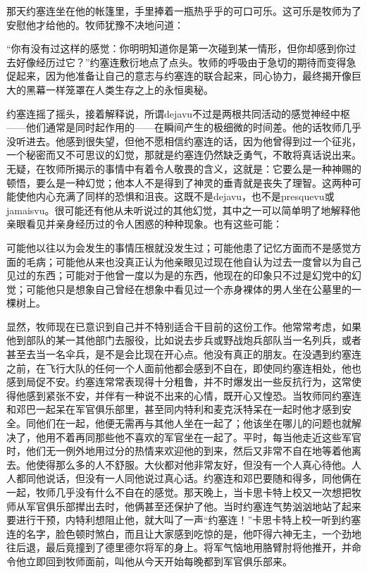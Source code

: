  


    那天约塞连坐在他的帐篷里，手里捧着一瓶热乎乎的可口可乐。这可乐是牧师为了安慰他才给他的。牧师犹豫不决地问道：

    “你有没有过这样的感觉：你明明知道你是第一次碰到某一情形，但你却感到你过去好像经历过它？”约塞连敷衍地点了点头。牧师的呼吸由于急切的期待而变得急促起来，因为他准备让自己的意志与约塞连的联合起来，同心协力，最终揭开像巨大的黑幕一样笼罩在人类生存之上的永恒奥秘。

    约塞连摇了摇头，接着解释说，所谓dejavu不过是两根共同活动的感觉神经中枢——他们通常是同时起作用的——在瞬间产生的极细微的时间差。他的话牧师几乎没听进去。他感到很失望，但他不愿相信约塞连的话，因为他曾得到过一个征兆，一个秘密而又不可思议的幻觉，那就是约塞连仍然缺乏勇气，不敢将真话说出来。无疑，在牧师所揭示的事情中有着令人敬畏的含义，这就是：它要么是一种神赐的顿悟，要么是一种幻觉；他本人不是得到了神灵的垂青就是丧失了理智。这两种可能使他内心充满了同样的恐惧和沮丧。这既不是dejavu，也不是presquevu或jamaisvu。很可能还有他从未听说过的其他幻觉，其中之一可以简单明了地解释他亲眼看见并亲身经历过的令人困惑的种种现象。也有这些可能：

    可能他以往以为会发生的事情压根就没发生过；可能他患了记忆方面而不是感觉方面的毛病；可能他从来也没真正认为他亲眼见过现在他自认为过去一度曾以为自己见过的东西；可能对于他曾一度以为是的东西，他现在的印象只不过是幻党中的幻觉；可能他只是想象自己曾经在想象中看见过一个赤身裸体的男人坐在公墓里的一棵树上。

 


    显然，牧师现在已意识到自己并不特别适合干目前的这份工作。他常常考虑，如果他到部队的某一其他部门去服役，比如说去步兵或野战炮兵部队当一名列兵，或者甚至去当一名伞兵，是不是会比现在开心点。他没有真正的朋友。在没遇到约塞连之前，在飞行大队的任何一个人面前他都会感到不自在，即使同约塞连相处，他也感到局促不安。约塞连常常表现得十分粗鲁，并不时爆发出一些反抗行为，这常使得他感到紧张不安，并伴有一种说不出来的心情，既开心又惶恐。当牧师同约塞连和邓巴一起呆在军官俱乐部里，甚至同内特利和麦克沃特呆在一起时他才感到安全。同他们在一起，他便无需再与其他人坐在一起了；他该坐在哪儿的问题也就解决了，他用不着再同那些他不喜欢的军官坐在一起了。平时，每当他走近这些军官时，他们无一例外地用过分的热情来欢迎他的到来，然后又非常不自在地等着他离去。他使得那么多的人不舒服。大伙都对他非常友好，但没有一个人真心待他。人人都同他说话，但没有一人同他说过真心话。约塞连和邓巴要随和得多，同他俩在一起，牧师几乎没有什么不自在的感觉。那天晚上，当卡思卡特上校又一次想把牧师从军官俱乐部撵出去时，他俩甚至还保护了他。当时约塞连气势汹汹地站了起来要进行干预，内特利想阻止他，就大叫了一声“约塞连！”卡思卡特上校一听到约塞连的名字，脸色顿时煞白，而且让大家感到吃惊的是，他吓得六神无主，一个劲地往后退，最后竟撞到了德里德尔将军的身上。将军气恼地用胳臂肘将他推开，并命令他立即回到牧师面前，叫他从今天开始每晚都到军官俱乐部来。

